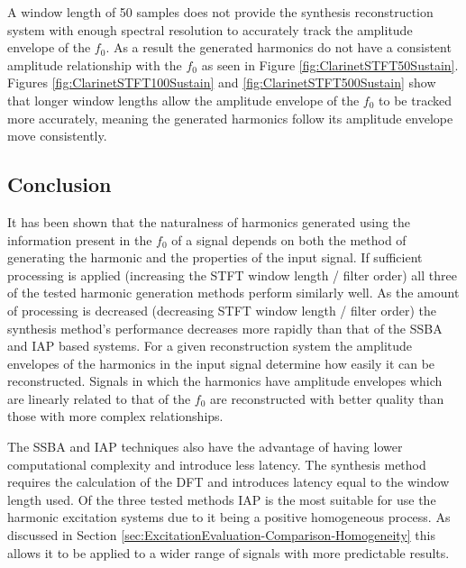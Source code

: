 		A window length of 50 samples does not provide the synthesis reconstruction system with enough spectral
		resolution to accurately track the amplitude envelope of the $f_{0}$. As a result the generated harmonics
		do not have a consistent amplitude relationship with the $f_{0}$ as seen in Figure
		\ref{fig:ClarinetSTFT50Sustain}. Figures \ref{fig:ClarinetSTFT100Sustain} and
		\ref{fig:ClarinetSTFT500Sustain} show that longer window lengths allow the amplitude envelope of the
		$f_{0}$ to be tracked more accurately, meaning the generated harmonics follow its amplitude envelope move
		consistently.
		
	\subsection{Conclusion}
	\label{sec:PerceptualExperiments-Reconstruction-Conclusion}
		It has been shown that the naturalness of harmonics generated using the information present in the $f_{0}$
		of a signal depends on both the method of generating the harmonic and the properties of the input signal.
		If sufficient processing is applied (increasing the STFT window length / filter order) all three of the
		tested harmonic generation methods perform similarly well. As the amount of processing is decreased
		(decreasing STFT window length / filter order) the synthesis method's performance decreases more rapidly
		than that of the SSBA and IAP based systems. For a given reconstruction system the amplitude envelopes of
		the harmonics in the input signal determine how easily it can be reconstructed. Signals in which the
		harmonics have amplitude envelopes which are linearly related to that of the $f_{0}$ are reconstructed with
		better quality than those with more complex relationships.
		
		The SSBA and IAP techniques also have the advantage of having lower computational complexity and introduce
		less latency. The synthesis method requires the calculation of the DFT and introduces latency equal to the
		window length used. Of the three tested methods IAP is the most suitable for use the harmonic excitation
		systems due to it being a positive homogeneous process. As discussed in Section
		\ref{sec:ExcitationEvaluation-Comparison-Homogeneity} this allows it to be applied to a wider range of
		signals with more predictable results.

